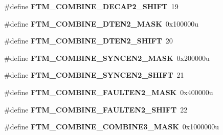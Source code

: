 \begin{DoxyCompactItemize}
\item 
\#define {\bfseries F\+T\+M\+\_\+\+C\+O\+M\+B\+I\+N\+E\+\_\+\+D\+E\+C\+A\+P2\+\_\+\+S\+H\+I\+FT}~19\hypertarget{group__FTM__Register__Masks_ga79322ba97c65c632a32e7cf7790286f9}{}\label{group__FTM__Register__Masks_ga79322ba97c65c632a32e7cf7790286f9}

\item 
\#define {\bfseries F\+T\+M\+\_\+\+C\+O\+M\+B\+I\+N\+E\+\_\+\+D\+T\+E\+N2\+\_\+\+M\+A\+SK}~0x100000u\hypertarget{group__FTM__Register__Masks_gadd286edd7ecc4625be042f1583ea8a74}{}\label{group__FTM__Register__Masks_gadd286edd7ecc4625be042f1583ea8a74}

\item 
\#define {\bfseries F\+T\+M\+\_\+\+C\+O\+M\+B\+I\+N\+E\+\_\+\+D\+T\+E\+N2\+\_\+\+S\+H\+I\+FT}~20\hypertarget{group__FTM__Register__Masks_ga46657f8744aea437178eb9de3a25b0ff}{}\label{group__FTM__Register__Masks_ga46657f8744aea437178eb9de3a25b0ff}

\item 
\#define {\bfseries F\+T\+M\+\_\+\+C\+O\+M\+B\+I\+N\+E\+\_\+\+S\+Y\+N\+C\+E\+N2\+\_\+\+M\+A\+SK}~0x200000u\hypertarget{group__FTM__Register__Masks_ga9b171aec492022bb55593f6bfae038da}{}\label{group__FTM__Register__Masks_ga9b171aec492022bb55593f6bfae038da}

\item 
\#define {\bfseries F\+T\+M\+\_\+\+C\+O\+M\+B\+I\+N\+E\+\_\+\+S\+Y\+N\+C\+E\+N2\+\_\+\+S\+H\+I\+FT}~21\hypertarget{group__FTM__Register__Masks_ga64914009d95ebee18e191655129c2c07}{}\label{group__FTM__Register__Masks_ga64914009d95ebee18e191655129c2c07}

\item 
\#define {\bfseries F\+T\+M\+\_\+\+C\+O\+M\+B\+I\+N\+E\+\_\+\+F\+A\+U\+L\+T\+E\+N2\+\_\+\+M\+A\+SK}~0x400000u\hypertarget{group__FTM__Register__Masks_gad67706e653caa0da6a85514ebd5d2fc7}{}\label{group__FTM__Register__Masks_gad67706e653caa0da6a85514ebd5d2fc7}

\item 
\#define {\bfseries F\+T\+M\+\_\+\+C\+O\+M\+B\+I\+N\+E\+\_\+\+F\+A\+U\+L\+T\+E\+N2\+\_\+\+S\+H\+I\+FT}~22\hypertarget{group__FTM__Register__Masks_ga35ee8ad9a6f4e07fa058735b7807e0a8}{}\label{group__FTM__Register__Masks_ga35ee8ad9a6f4e07fa058735b7807e0a8}

\item 
\#define {\bfseries F\+T\+M\+\_\+\+C\+O\+M\+B\+I\+N\+E\+\_\+\+C\+O\+M\+B\+I\+N\+E3\+\_\+\+M\+A\+SK}~0x1000000u\hypertarget{group__FTM__Register__Masks_gac97253f34364aee2a49e2ad8c470f46c}{}\label{group__FTM__Register__Masks_gac97253f34364aee2a49e2ad8c470f46c}


\end{DoxyCompactItemize}
